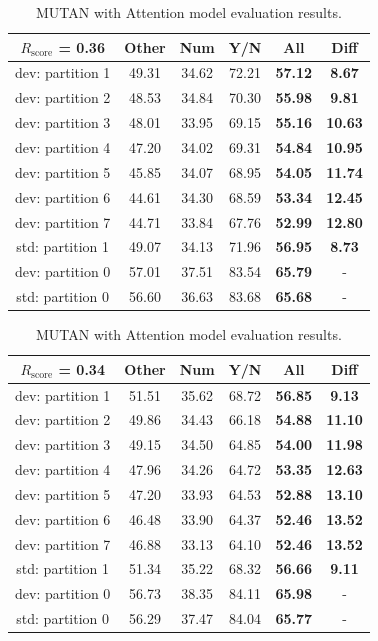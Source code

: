 \documentclass[letterpaper]{article}
\newcommand{\rscore}{}\def\rscore/{$R_{\text{score}}$}
\begin{document}
\begin{table}
\begin{subtable}{0.49\linewidth}
		\begin{tabular}{c | c c c c | c}
			\rscore/ = 0.36  & Other & Num   & Y/N   & All            & Diff           \\ [0.5ex]
			\hline
			dev: partition 1 & 49.31 & 34.62 & 72.21 & \textbf{57.12} & \textbf{8.67}  \\
			dev: partition 2 & 48.53 & 34.84 & 70.30 & \textbf{55.98} & \textbf{9.81}  \\
			dev: partition 3 & 48.01 & 33.95 & 69.15 & \textbf{55.16} & \textbf{10.63} \\
			dev: partition 4 & 47.20 & 34.02 & 69.31 & \textbf{54.84} & \textbf{10.95} \\
			dev: partition 5 & 45.85 & 34.07 & 68.95 & \textbf{54.05} & \textbf{11.74} \\
			dev: partition 6 & 44.61 & 34.30 & 68.59 & \textbf{53.34} & \textbf{12.45} \\
			dev: partition 7 & 44.71 & 33.84 & 67.76 & \textbf{52.99} & \textbf{12.80} \\
			\hline
			std: partition 1 & 49.07 & 34.13 & 71.96 & \textbf{56.95} & \textbf{8.73}  \\
			\hline
			dev: partition 0 & 57.01 & 37.51 & 83.54 & \textbf{65.79} & -              \\
			std: partition 0 & 56.60 & 36.63 & 83.68 & \textbf{65.68} & -              \\
			\hline
		\end{tabular}
		\caption{MLB with Attention model evaluation results.}
	\end{subtable}
	\begin{subtable}{0.49\linewidth}
		\begin{tabular}{c | c c c c | c}
			\rscore/ = 0.34  & Other & Num   & Y/N   & All            & Diff           \\ [0.5ex]
			\hline
			dev: partition 1 & 51.51 & 35.62 & 68.72 & \textbf{56.85} & \textbf{9.13}  \\
			dev: partition 2 & 49.86 & 34.43 & 66.18 & \textbf{54.88} & \textbf{11.10} \\
			dev: partition 3 & 49.15 & 34.50 & 64.85 & \textbf{54.00} & \textbf{11.98} \\
			dev: partition 4 & 47.96 & 34.26 & 64.72 & \textbf{53.35} & \textbf{12.63} \\
			dev: partition 5 & 47.20 & 33.93 & 64.53 & \textbf{52.88} & \textbf{13.10} \\
			dev: partition 6 & 46.48 & 33.90 & 64.37 & \textbf{52.46} & \textbf{13.52} \\
			dev: partition 7 & 46.88 & 33.13 & 64.10 & \textbf{52.46} & \textbf{13.52} \\
			\hline
			std: partition 1 & 51.34 & 35.22 & 68.32 & \textbf{56.66} & \textbf{9.11}  \\
			\hline
			dev: partition 0 & 56.73 & 38.35 & 84.11 & \textbf{65.98} & -              \\
			std: partition 0 & 56.29 & 37.47 & 84.04 & \textbf{65.77} & -              \\
			\hline
		\end{tabular}
		\caption{MUTAN with Attention model evaluation results.}


\end{subtable}
\end{table}
\end{document}
